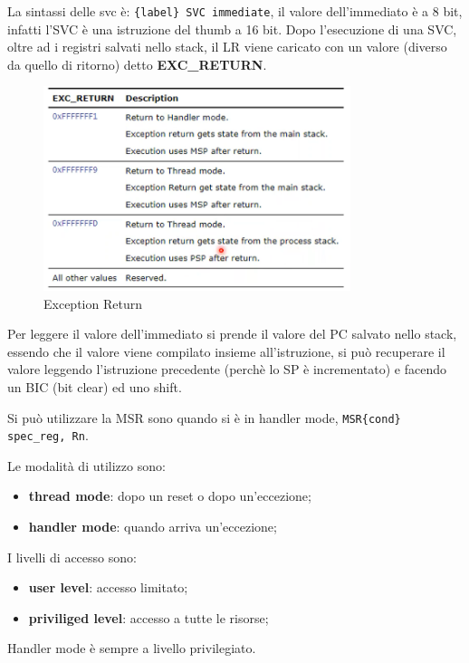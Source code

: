 \documentclass[12pt]{article}
\begin{document}
La sintassi delle svc \`e: \texttt{\{label\} SVC immediate}, il valore dell'immediato \`e a 8 bit, infatti l'SVC \`e una istruzione del thumb a 16 bit. Dopo l'esecuzione di una SVC, oltre ad i registri salvati nello stack, il LR viene caricato con un valore (diverso da quello di ritorno) detto \textbf{EXC\_RETURN}. 
\begin{figure}[H]
    \centering
    \includegraphics[width=0.8\textwidth]{exception-return.png}
    \caption{Exception Return}
    \label{fig:exception-return}
\end{figure}
Per leggere il valore dell'immediato si prende il valore del PC salvato nello stack, essendo che il valore viene compilato insieme all'istruzione, si pu\`o recuperare il valore leggendo l'istruzione precedente (perch\`e lo SP \`e incrementato) e facendo un BIC (bit clear) ed uno shift.

Si pu\`o utilizzare la MSR sono quando si \`e in handler mode, \texttt{MSR\{cond\} spec\_reg, Rn}.

Le modalit\`a di utilizzo sono:
\begin{itemize}
    \item \textbf{thread mode}: dopo un reset o dopo un'eccezione;
    \item \textbf{handler mode}: quando arriva un'eccezione;
\end{itemize}
I livelli di accesso sono:
\begin{itemize}
    \item \textbf{user level}: accesso limitato;
    \item \textbf{priviliged level}: accesso a tutte le risorse;
\end{itemize}
Handler mode \`e sempre a livello privilegiato.
\end{document}
